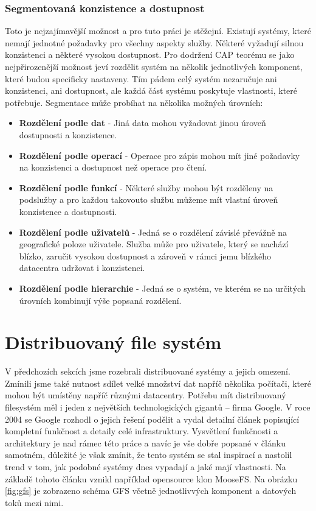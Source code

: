 \subsubsection{Segmentovaná konzistence a dostupnost}
Toto je nejzajímavější možnost a pro tuto práci je stěžejní. Existují systémy, které nemají jednotné požadavky pro všechny aspekty služby. Některé vyžadují silnou konzistenci a některé vysokou dostupnost. Pro dodržení CAP teorému se jako nejpřirozenější možnost jeví rozdělit systém na několik jednotlivých komponent, které budou specificky nastaveny. Tím pádem celý systém nezaručuje ani konzistenci, ani dostupnost, ale každá část systému poskytuje vlastnosti, které potřebuje. Segmentace může probíhat na několika možných úrovních: 

\begin{itemize}
\item \textbf{Rozdělení podle dat} - Jiná data mohou vyžadovat jinou úroveň dostupnosti a konzistence.
\item \textbf{Rozdělení podle operací} - Operace pro zápis mohou mít jiné požadavky na konzistenci a dostupnost než operace pro čtení.
\item \textbf{Rozdělení podle funkcí} - Některé služby mohou být rozděleny na podslužby a pro každou takovouto službu můžeme mít vlastní úroveň konzistence a dostupnosti. 
\item \textbf{Rozdělení podle uživatelů} - Jedná se o rozdělení závislé převážně na geografické poloze uživatele. Služba může pro uživatele, který se nachází blízko, zaručit vysokou dostupnost a zároveň v rámci jemu blízkého datacentra udržovat i konzistenci. 
\item \textbf{Rozdělení podle hierarchie} - Jedná se o systém, ve kterém se na určitých úrovních kombinují výše popsaná rozdělení.
 
\end{itemize}
\section{Distribuovaný file systém}

V předchozích sekcích jsme rozebrali distribuované systémy a jejich omezení. Zmínili jsme také nutnost sdílet velké množství dat napříč několika počítači, které mohou být umístěny napříč různými datacentry. Potřebu mít distribuovaný filesystém měl i jeden z největších technologických gigantů – firma Google. V roce 2004 se Google rozhodl o jejich řešení podělit a vydal detailní článek \cite{gfs} popisující kompletní funkčnost a detaily celé infrastruktury. Vysvětlení funkčnosti a architektury je nad rámec této práce a navíc je vše dobře popsané v článku samotném, důležité je však zmínit, že tento systém se stal inspirací a nastolil trend v tom, jak podobné systémy dnes vypadají a jaké mají vlastnosti. Na základě tohoto článku vznikl například opensource klon MooseFS. Na obrázku \ref{fig:gfs} je zobrazeno schéma GFS včetně jednotlivvých komponent a datových toků mezi nimi. 

